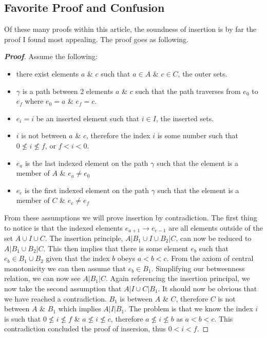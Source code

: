 \documentclass[a4paper,man,natbib]{apa6}
\begin{document}
\subsection{Favorite Proof and Confusion}

      Of these many proofs within this article, the soundness of insertion is by far the proof I found most appealing.
The proof goes as following.

\begin{proof}[\textbf{Proof}]

      Assume the following:

      \begin{itemize}

            \item there exist elements $ a $ \& $ c $ such that $ a \in A $ \& $ c \in C $, the outer sets.

            \item $ \gamma $ is a path between 2 elements $ a $ \& $ c $ such that the path traverses from $ e_0 $ to $ e_f $ where $ e_0 = a $ \& $ e_f = c $.

            \item $ e_i = i $ be an inserted element such that $ i \in I $, the inserted sets.

            \item $ i $ is not between $ a $ \& $ c $, therefore the index $ i $ is some number such that $ 0 \nleq i \nleq f $, or $ f < i < 0 $.

            \item $ e_a $ is the last indexed element on the path $ \gamma $ such that the element is a member of $ A $ \& $ e_a \neq e_0 $
            \item $ e_c $ is the first indexed element on the path $ \gamma $ such that the element is a member of $ C $ \& $ e_c \neq e_f $

      \end{itemize}

      \noindent
      From these assumptions we will prove insertion by contradiction.
      The first thing to notice is that the indexed elements $ e_{a+1} \to e_{c-1} $ are all elements outside of the set $ A \cup I \cup C $.
      The insertion principle, $ A | B_1 \cup I \cup B_2 | C $, can now be reduced to $ A | B_1 \cup B_2 | C $.
      This then implies that there is some element $ e_b $ such that $ e_b \in B_1 \cup B_2 $ given that the index $ b $ obeys $ a < b < c $.
      From the axiom of central monotonicity we can then assume that $ e_b \in B_1 $.
      Simplifying our betweenness relation, we can now see $ A | B_1 | C $.
      Again referencing the insertion principal, we now take the second assumption that $ A | I \cup C | B_1 $.
      It should now be obvious that we have reached a contradiction.
      $ B_1 $ is between $ A $ \& $ C $, therefore $ C $ is not between $ A $ \& $ B_1 $ which implies $ A | I | B_1 $.
      The problem is that we know the index $ i $ is such that $ 0 \nleq i \nleq f $ \& $ a \nleq i \nleq c $, therefore $ a \nleq i \nleq b $ as $ a < b < c $.
      This contradiction concluded the proof of insersion, thus $ 0 < i < f $.

\end{proof}
\end{document}
